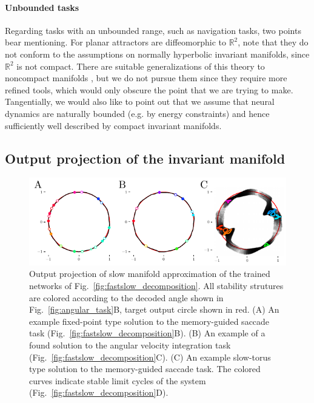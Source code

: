 \documentclass{article} %
\newcounter{ct}
\newcommand{\reals}{\mathbb{R}}
\theoremstyle{definition}
\theoremstyle{remark}
\begin{document}
\paragraph{Unbounded tasks}
Regarding tasks with an unbounded range, such as navigation tasks, two points bear mentioning.
%
For planar attractors are diffeomorphic to \(\reals^{2}\), note that they do not conform to the assumptions on normally hyperbolic invariant manifolds, since \(\reals^{2}\) is not compact.
There are suitable generalizations of this theory to noncompact manifolds \citep{eldering2013normally}, but we do not pursue them since they require more refined tools, which would only obscure the point that we are trying to make.
Tangentially, we would also like to point out that we assume that neural dynamics are naturally bounded (e.g. by energy constraints) and hence sufficiently well described by compact invariant manifolds.


\subsection{Output projection of the invariant manifold}

\begin{figure}[tbhp]
  \centering
  \includegraphics[width=\textwidth]{fastslow_decomposition_outputs_s}
  \caption{Output projection of slow manifold approximation of the trained networks of Fig.~\ref{fig:fastslow_decomposition}. All stability strutures are colored according to the decoded angle shown in Fig.~\ref{fig:angular_task}B, target output circle shown in red.
 (A) An example fixed-point type solution to the memory-guided saccade task (Fig.~\ref{fig:fastslow_decomposition}B).
 (B) An example of a found solution to the angular velocity integration task (Fig.~\ref{fig:fastslow_decomposition}C).
 (C) An example slow-torus type solution to the memory-guided saccade task. The colored curves indicate stable limit cycles of the system (Fig.~\ref{fig:fastslow_decomposition}D).
}\label{fig:fastslow_decomposition_otuput}
\end{figure}
\end{document}

